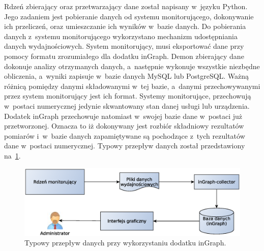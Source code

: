 Rdzeń zbierający oraz przetwarzający dane został napisany w~języku
Python. Jego zadaniem jest pobieranie danych od systemu
monitorującego, dokonywanie ich przeliczeń, oraz umieszczanie ich
wyników w~bazie danych. Do pobierania danych z~systemu monitorującego
wykorzystano mechanizm udostępniania danych wydajnościowych. System
monitorujący, musi eksportować dane przy pomocy formatu zrozumiałego
dla dodatku inGraph. Demon zbierający dane dokonuje analizy
otrzymanych danych, a~następnie wykonuje wszystkie niezbędne
obliczenia, a~wyniki zapisuje w~bazie danych MySQL lub
PostgreSQL. Ważną różnicą pomiędzy danymi składowanymi w~tej bazie,
a~danymi przechowywanymi przez system monitorujący jest ich
format. Systemy monitorujące, przechowują w~postaci numerycznej
jedynie skwantowany stan danej usługi lub urządzenia. Dodatek inGraph
przechowuje natomiast w~swojej bazie dane w~postaci już
przetworzonej. Oznacza to iż dokonywany jest rozbiór składniowy
rezultatów pomiarów i~w~bazie danych zapamiętywane są pochodzące
z~tych rezultatów dane w~postaci numerycznej. Typowy przepływ danych
został przedstawiony na~\ref{fig:inGraphFlow}.

\begin{figure}[ht]
  \caption{Typowy przepływ danych przy wykorzystaniu dodatku inGraph.}
  \label{fig:inGraphFlow}
\includegraphics[width=1\textwidth]{img/ingraphFlow}
\end{figure}

